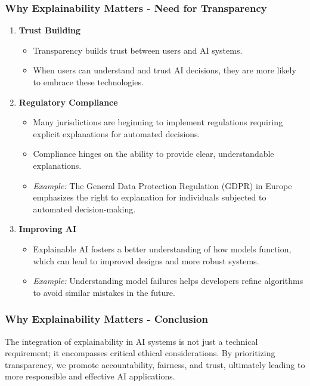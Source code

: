 \documentclass[aspectratio=169]{beamer}
\begin{document}
\begin{frame}[fragile]
    \frametitle{Why Explainability Matters - Need for Transparency}
    \begin{enumerate}
        \item \textbf{Trust Building}
        \begin{itemize}
            \item Transparency builds trust between users and AI systems. 
            \item When users can understand and trust AI decisions, they are more likely to embrace these technologies.
        \end{itemize}
        
        \item \textbf{Regulatory Compliance}
        \begin{itemize}
            \item Many jurisdictions are beginning to implement regulations requiring explicit explanations for automated decisions.
            \item Compliance hinges on the ability to provide clear, understandable explanations.
            \item \textit{Example:} The General Data Protection Regulation (GDPR) in Europe emphasizes the right to explanation for individuals subjected to automated decision-making.
        \end{itemize}
        
        \item \textbf{Improving AI}
        \begin{itemize}
            \item Explainable AI fosters a better understanding of how models function, which can lead to improved designs and more robust systems.
            \item \textit{Example:} Understanding model failures helps developers refine algorithms to avoid similar mistakes in the future.
        \end{itemize}
    \end{enumerate}
\end{frame}

\begin{frame}[fragile]
    \frametitle{Why Explainability Matters - Conclusion}
    The integration of explainability in AI systems is not just a technical requirement; it encompasses critical ethical considerations. 
    By prioritizing transparency, we promote accountability, fairness, and trust, ultimately leading to more responsible and effective AI applications.
\end{frame}
\end{document}
